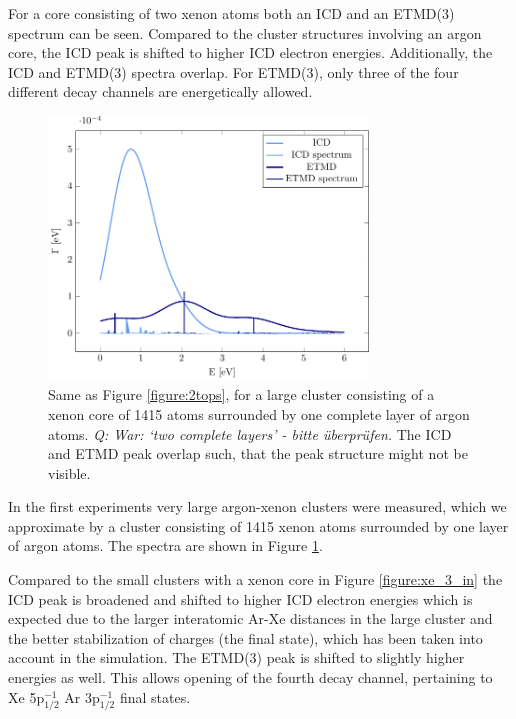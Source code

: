 For a core consisting of two xenon atoms both an ICD and an ETMD(3) spectrum
can be seen. Compared to the cluster structures involving an argon core, the ICD peak is
shifted to higher ICD electron energies. 
Additionally, the ICD and ETMD(3) spectra overlap.
For ETMD(3), only three of the four different decay channels are
energetically allowed.

\begin{figure}[ht]
 \centering
 \includegraphics[width=8.5cm]{pics/xe_8_1lay.pdf}
 \caption{Same as Figure \protect\ref{figure:2tops}, for a large cluster consisting
          of a xenon core of 1415 atoms surrounded by one complete layer of
          argon atoms. {\it Q: War: `two complete layers' - bitte \"uberpr\"ufen.} The ICD and ETMD peak overlap such, that the peak structure
          might not be visible.}
 \label{figure:xe_8_lay1}
\end{figure}
%
In the first experiments very large argon-xenon clusters were measured,\cite{Mucke_phd}
which we approximate by a cluster consisting of 1415 xenon atoms surrounded
by one layer of argon atoms. The spectra are shown in Figure
\ref{figure:xe_8_lay1}.

Compared to the small clusters with a xenon core in Figure \ref{figure:xe_3_in}
the ICD peak is broadened and shifted to higher ICD electron energies which is
expected due to the larger interatomic Ar-Xe distances in the large cluster and
the better stabilization of charges (the final state), which has been taken into account
in the simulation.
The ETMD(3) peak is shifted to slightly higher energies as well. This allows opening of the
fourth decay channel, pertaining to Xe 5p$_{1/2}^{-1}$ Ar 3p$_{1/2}^{-1}$ final states.
